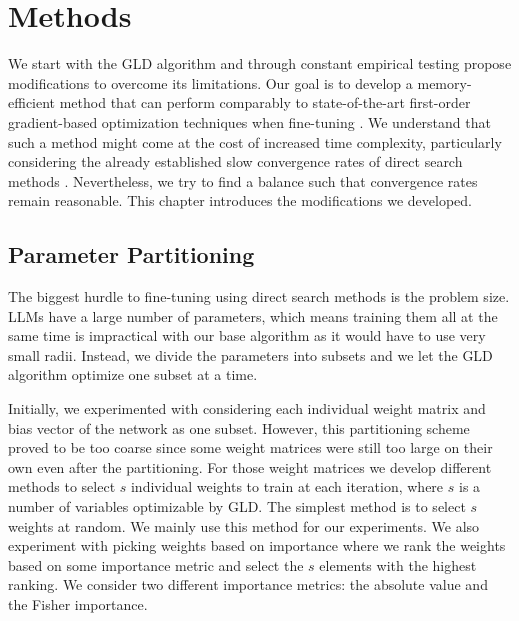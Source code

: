 \chapter{Methods} \label{chapter:methods}

We start with the \ac{GLD} algorithm \parencite{gld} 
and through constant 
empirical testing propose modifications to overcome its
limitations. Our goal is to 
develop a memory-efficient method
that can perform comparably to 
state-of-the-art first-order gradient-based optimization
techniques when fine-tuning .
We understand that such a method might come at the 
cost of increased
time complexity, particularly considering the 
already established slow convergence rates of direct 
search methods \parencite{directsearch}. 
Nevertheless, we try to find a balance
such that convergence rates remain reasonable.  
This chapter introduces the modifications we developed.

\section{Parameter Partitioning}\label{section:partitioning}
The biggest hurdle to fine-tuning  using 
direct search methods is the problem size. \acp{LLM}
have a large number of parameters, 
which means training them all at the same time 
is impractical with our base algorithm as it would 
have to use very small radii. 
Instead, we divide the parameters into
subsets and we let 
the \ac{GLD} algorithm optimize one subset at a time. 

Initially, we experimented with considering each individual weight matrix and
bias vector of the network as one subset. 
However, this partitioning scheme proved to be too 
coarse since some weight matrices were still too large 
on their own even after the partitioning.
For those
weight matrices we develop different methods to 
select $s$ individual weights
to train at each iteration, where $s$ is a number of variables
optimizable by \ac{GLD}. The simplest method
is to select $s$ weights at random. We mainly use this 
method for our experiments. We also experiment with 
picking weights based on importance where we 
rank the weights based on some importance
metric and select the $s$ elements with the highest ranking. 
We consider two different importance metrics: the absolute
value and the Fisher importance. 

